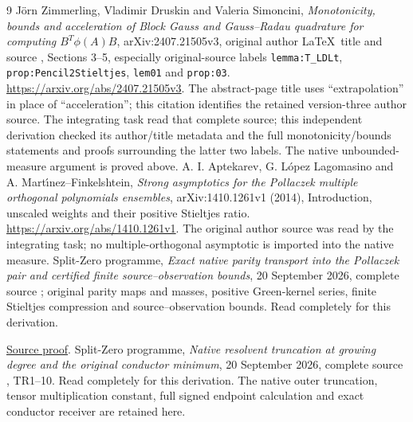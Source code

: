 \documentclass[11pt]{article}
\begin{document}
\begin{thebibliography}{9}
J\"orn Zimmerling, Vladimir Druskin and Valeria Simoncini,
\emph{Monotonicity, bounds and acceleration of Block Gauss and
Gauss--Radau quadrature for computing $B^T\phi(A)B$},
arXiv:2407.21505v3, original author \LaTeX\ title and source
, Sections 3--5, especially original-source
labels \texttt{lemma:T\_LDLt}, \texttt{prop:Pencil2Stieltjes},
\texttt{lem01} and \texttt{prop:03}.
\url{https://arxiv.org/abs/2407.21505v3}.
The abstract-page title uses ``extrapolation'' in place of
``acceleration''; this citation identifies the retained version-three
author source.  The integrating task read that complete source; this
independent derivation checked its author/title metadata and the full
monotonicity/bounds statements and proofs surrounding the latter two
labels.  The native unbounded-measure argument is proved above.
A. I. Aptekarev, G. L\'opez Lagomasino and A. Mart\'{\i}nez--Finkelshtein,
\emph{Strong asymptotics for the Pollaczek multiple orthogonal
polynomials ensembles}, arXiv:1410.1261v1 (2014), Introduction,
unscaled weights and their positive Stieltjes ratio.
\url{https://arxiv.org/abs/1410.1261v1}.
The original author source was read by the integrating task; no
multiple-orthogonal asymptotic is imported into the native measure.
Split-Zero programme, \emph{Exact native parity transport into the
Pollaczek pair and certified finite source--observation bounds},
20 September 2026, complete source
;
original parity maps and masses, positive Green-kernel series,
finite Stieltjes compression and source--observation bounds.
Read completely for this derivation.

\href{https://github.com/KokunoYumeto/zeta-function-research-reader/blob/5992ad50c0f2a06921f1fcaded7b4e38097c0739/workbenches/splitzero-tandem/continuations/20260920-original-kernel-mixed-determinants/providers/PARITY_POLLACZEK_NATIVE_RECEIVER.tex\#L1}{Source proof}.
Split-Zero programme, \emph{Native resolvent truncation at growing
degree and the original conductor minimum}, 20 September 2026,
complete source ,
TR1--10.  Read completely for this derivation.  The native outer
truncation, tensor multiplication constant, full signed endpoint
calculation and exact conductor receiver are retained here.


\end{thebibliography}
\end{document}
